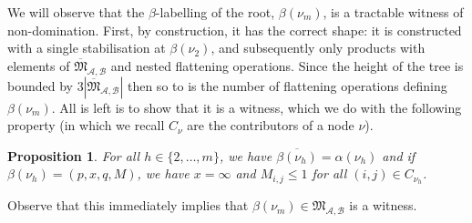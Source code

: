 \documentclass[10pt,a4paper]{amsart}
\newtheorem{prop}[prop]{Proposition}
\theoremstyle{definition}
\numberwithin{equation}{section}
\theoremstyle{remark}
\newcommand{\ideal}{\mathfrak{M}}
\newcommand{\autA}{\mathcal{A}}
\newcommand{\autB}{\mathcal{B}}
\theoremstyle{remark}
\begin{document}
We will observe that the $\beta$-labelling of the root, $\beta(\nu_m)$, is a tractable witness of non-domination. First, by construction, it has the correct shape: it is constructed with a single stabilisation at $\beta(\nu_2)$, and subsequently only products with elements of $\overline{\ideal}_{\autA,\autB}$ and nested flattening operations. Since the height of the tree is bounded by $3|\overline{\ideal}_{\autA,\autB}|$ then so to is the number of flattening operations defining $\beta(\nu_m)$. All is left is to show that it is a witness, which we do with the following property (in which we recall $C_{\nu}$ are the contributors of a node $\nu$).

\begin{prop}
\label{lemma:betanumiswitness}
For all $h\in\{2,\dots,m\}$, we have $\overline{\beta(\nu_h)} = \alpha(\nu_h)$ and if $\beta(\nu_h)= (p,x,q,M)$, we have $x=\infty$ and $M_{i,j} \le 1$ for all $(i,j) \in C_{\nu_h}$.
\end{prop}

Observe that this immediately implies that $\beta(\nu_m) \in \ideal_{\autA,\autB}$ is a witness.
\end{document}
